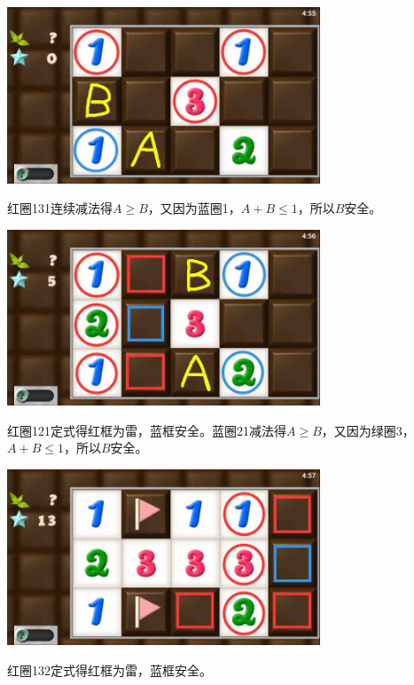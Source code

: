 \subsection{} %
\begin{center}
    \includegraphics[width=0.7\textwidth]{puzzlelow/74-1.jpg}
\end{center}
红圈131连续减法得$A\ge B$，又因为蓝圈1，$A+B\le 1$，所以$B$安全。
\begin{center}
    \includegraphics[width=0.7\textwidth]{puzzlelow/74-2.jpg}
\end{center}
红圈121定式得红框为雷，蓝框安全。蓝圈21减法得$A\ge B$，又因为绿圈3，$A+B\le 1$，所以$B$安全。
\begin{center}
    \includegraphics[width=0.7\textwidth]{puzzlelow/74-3.jpg}
\end{center}
红圈132定式得红框为雷，蓝框安全。

